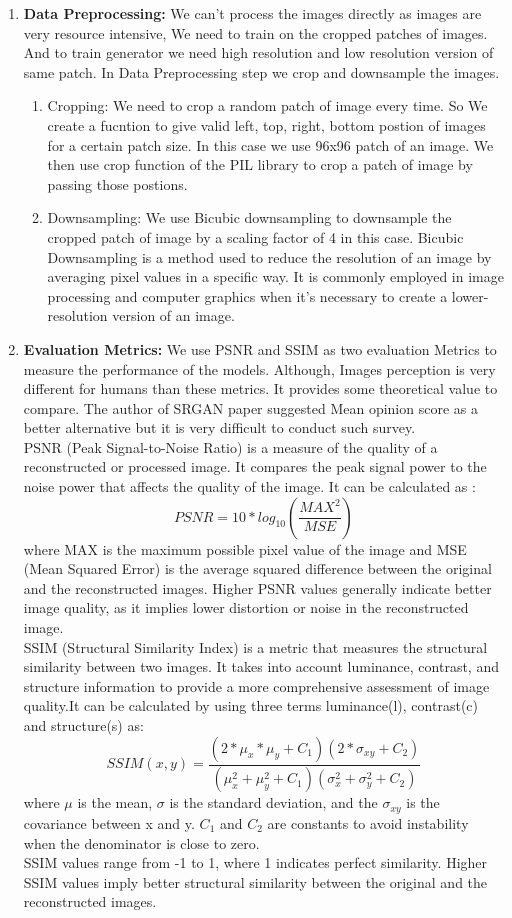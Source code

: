\begin{enumerate}
    \item {\bf Data Preprocessing:} We can't process the images directly as images are very resource intensive, We need to train on the cropped patches of images. And to train generator we need high resolution and low resolution version of same patch. In Data Preprocessing step we crop and downsample the images. 
    \begin{enumerate}
        \item Cropping: We need to crop a random patch of image every time. So We create a fucntion to give  valid left, top, right, bottom postion of images for a certain patch size. In this case we use 96x96 patch of an image. We then use crop function of the PIL library to crop a patch of image by passing those postions.
        \item Downsampling: We use Bicubic downsampling  to downsample the cropped patch of image by a scaling factor of 4 in this case. Bicubic Downsampling is a method used to reduce the resolution of an image by averaging pixel values in a specific way. It is commonly employed in image processing and computer graphics when it's necessary to create a lower-resolution version of an image.
    \end{enumerate}
    \item {\bf Evaluation Metrics:} We use PSNR and SSIM as two evaluation Metrics to measure the performance of the models. Although, Images perception is very different for humans than these metrics. It provides some theoretical value to compare. The author of SRGAN paper suggested Mean opinion score as a better alternative but it is very difficult to conduct such survey.\\
    PSNR (Peak Signal-to-Noise Ratio) is a measure of the quality of a reconstructed or processed image. It compares the peak signal power to the noise power that affects the quality of the image. It can be calculated as :
    $$PSNR = 10*log_{10}(\frac{MAX^{2}}{MSE})$$
    where MAX is the maximum possible pixel value of the image and MSE (Mean Squared Error) is the average squared difference between the original and the reconstructed images. Higher PSNR values generally indicate better image quality, as it implies lower distortion or noise in the reconstructed image.\\
    SSIM (Structural Similarity Index) is a metric that measures the structural similarity between two images. It takes into account luminance, contrast, and structure information to provide a more comprehensive assessment of image quality.It can be calculated by using three terms luminance(l), contrast(c) and structure(s) as:
    $$SSIM(x,y)= \frac{(2*\mu _x*\mu _y+C_1)(2*\sigma_{xy}+C_2)}{(\mu_x^2+\mu_y^2+C_1)(\sigma_x^2+\sigma_y^2+C_2)}$$
    where $\mu$ is the mean, $\sigma$ is the standard deviation, and the $\sigma_{xy}$ is the covariance between x and y. $C_1$ and $C_2$ are constants to avoid instability when the denominator is close to zero. \\
    SSIM values range from -1 to 1, where 1 indicates perfect similarity. Higher SSIM values imply better structural similarity between the original and the reconstructed images.
\end{enumerate}